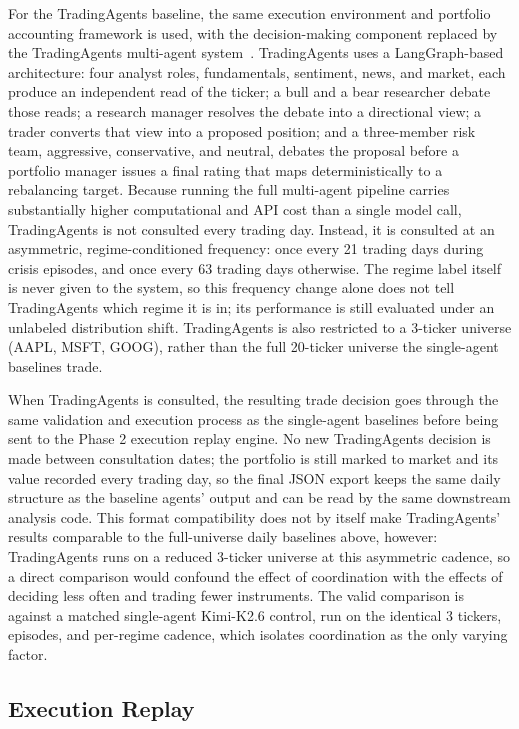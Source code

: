 \documentclass{article}
\begin{document}
For the TradingAgents baseline, the same execution environment and portfolio accounting framework is used, with the decision-making component replaced by the TradingAgents multi-agent system~\cite{xiao2024ta}. TradingAgents uses a LangGraph-based architecture: four analyst roles, fundamentals, sentiment, news, and market, each produce an independent read of the ticker; a bull and a bear researcher debate those reads; a research manager resolves the debate into a directional view; a trader converts that view into a proposed position; and a three-member risk team, aggressive, conservative, and neutral, debates the proposal before a portfolio manager issues a final rating that maps deterministically to a rebalancing target. Because running the full multi-agent pipeline carries substantially higher computational and API cost than a single model call, TradingAgents is not consulted every trading day. Instead, it is consulted at an asymmetric, regime-conditioned frequency: once every 21 trading days during crisis episodes, and once every 63 trading days otherwise. The regime label itself is never given to the system, so this frequency change alone does not tell TradingAgents which regime it is in; its performance is still evaluated under an unlabeled distribution shift. TradingAgents is also restricted to a 3-ticker universe (AAPL, MSFT, GOOG), rather than the full 20-ticker universe the single-agent baselines trade.

When TradingAgents is consulted, the resulting trade decision goes through the same validation and execution process as the single-agent baselines before being sent to the Phase 2 execution replay engine. No new TradingAgents decision is made between consultation dates; the portfolio is still marked to market and its value recorded every trading day, so the final JSON export keeps the same daily structure as the baseline agents' output and can be read by the same downstream analysis code. This format compatibility does not by itself make TradingAgents' results comparable to the full-universe daily baselines above, however: TradingAgents runs on a reduced 3-ticker universe at this asymmetric cadence, so a direct comparison would confound the effect of coordination with the effects of deciding less often and trading fewer instruments. The valid comparison is against a matched single-agent Kimi-K2.6 control, run on the identical 3 tickers, episodes, and per-regime cadence, which isolates coordination as the only varying factor.

\subsection{Execution Replay}
\end{document}
